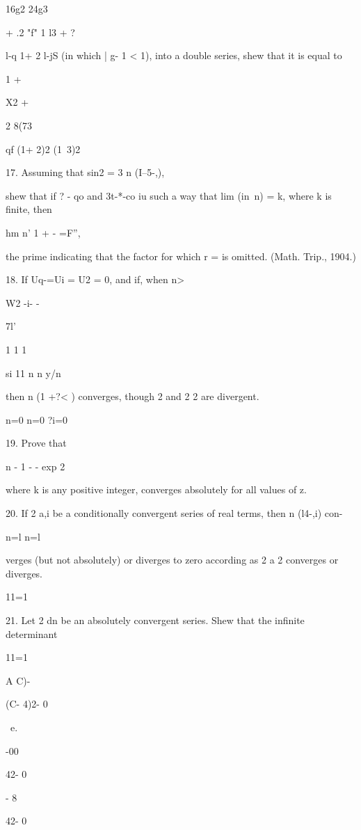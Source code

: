 16g2 24g3

+ .2 "f" 1 l3 +    ?

l-q 1+ 2 l-jS (in which | g- 1 < 1), into a double series, shew that
it is equal to

1 +

X2 +

2 8(73

  qf (1+ 2)2 (1\ 3)2


%
%

17. Assuming that sin2 = 3 n (I--5-,),

shew that if ? - qo and 3t-*-co iu such a way that lim (in\ n) = k,
where k is finite, then

hm n' 1 + - =F'',

the prime indicating that the factor for which r = is omitted. (Math.
Trip., 1904.)

18. If Uq-=Ui = U2 = 0, and if, when n>\,

W2 -i- -

 7l'

1 1 1

si 11 n n y/n

then n (1 +?< ) converges, though 2 and 2 2 are divergent.

n=0 n=0 ?i=0


19. Prove that

n - 1 - - exp 2

where k is any positive integer, converges absolutely for all values
of z.

20. If 2 a,i be a conditionally convergent series of real terms, then
n (l4-,i) con-

n=l n=l

verges (but not absolutely) or diverges to zero according as 2 a 2
converges or diverges.

11=1


21. Let 2 dn be an absolutely convergent series. Shew that the
infinite determinant

11=1

A C)-

(C- 4)2- 0

~e.

-00

42- 0

- 8

42- 0

